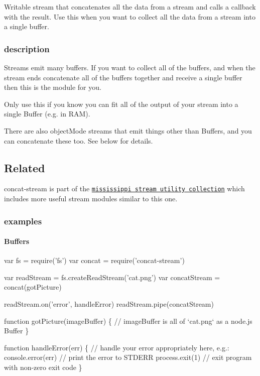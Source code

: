 Writable stream that concatenates all the data from a stream and calls a callback with the result. Use this when you want to collect all the data from a stream into a single buffer.

\href{https://travis-ci.org/maxogden/concat-stream}{\tt }

\href{https://nodei.co/npm/concat-stream/}{\tt }

\subsubsection*{description}

Streams emit many buffers. If you want to collect all of the buffers, and when the stream ends concatenate all of the buffers together and receive a single buffer then this is the module for you.

Only use this if you know you can fit all of the output of your stream into a single Buffer (e.\+g. in R\+AM).

There are also {\ttfamily object\+Mode} streams that emit things other than Buffers, and you can concatenate these too. See below for details.

\subsection*{Related}

{\ttfamily concat-\/stream} is part of the \href{https://github.com/maxogden/mississippi}{\tt mississippi stream utility collection} which includes more useful stream modules similar to this one.

\subsubsection*{examples}

\paragraph*{Buffers}


\begin{DoxyCode}
var fs = require('fs')
var concat = require('concat-stream')

var readStream = fs.createReadStream('cat.png')
var concatStream = concat(gotPicture)

readStream.on('error', handleError)
readStream.pipe(concatStream)

function gotPicture(imageBuffer) \{
  // imageBuffer is all of `cat.png` as a node.js Buffer
\}

function handleError(err) \{
  // handle your error appropriately here, e.g.:
  console.error(err) // print the error to STDERR
  process.exit(1) // exit program with non-zero exit code
\}
\end{DoxyCode}


